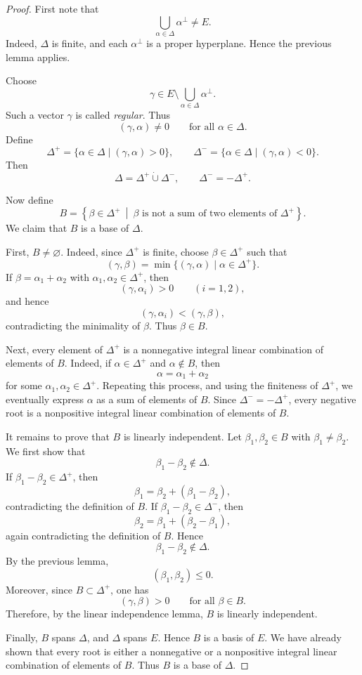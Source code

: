 \begin{proof}
    First note that
    \[
        \bigcup_{\alpha\in\Delta}\alpha^\perp
        \neq E.
    \]
    Indeed, \(\Delta\) is finite, and each \(\alpha^\perp\) is a proper
    hyperplane. Hence the previous lemma applies.

    Choose
    \[
        \gamma\in E\setminus \bigcup_{\alpha\in\Delta}\alpha^\perp.
    \]
    Such a vector \(\gamma\) is called \emph{regular}. Thus
    \[
        (\gamma,\alpha)\neq 0
        \qquad
        \text{for all } \alpha\in\Delta.
    \]
    Define
    \[
        \Delta^+
        =
        \{\alpha\in\Delta\mid (\gamma,\alpha)>0\},
        \qquad
        \Delta^-
        =
        \{\alpha\in\Delta\mid (\gamma,\alpha)<0\}.
    \]
    Then
    \[
        \Delta=\Delta^+\dot\cup\Delta^-,
        \qquad
        \Delta^-=-\Delta^+.
    \]

    Now define
    \[
        B
        =
        \left\{
        \beta\in\Delta^+
        \ \middle|\
        \beta \text{ is not a sum of two elements of } \Delta^+
        \right\}.
    \]
    We claim that \(B\) is a base of \(\Delta\).

    First, \(B\neq\varnothing\). Indeed, since \(\Delta^+\) is finite, choose
    \(\beta\in\Delta^+\) such that
    \[
        (\gamma,\beta)
        =
        \min\{(\gamma,\alpha)\mid \alpha\in\Delta^+\}.
    \]
    If \(\beta=\alpha_1+\alpha_2\) with \(\alpha_1,\alpha_2\in\Delta^+\), then
    \[
        (\gamma,\alpha_i)>0
        \qquad
        (i=1,2),
    \]
    and hence
    \[
        (\gamma,\alpha_i)<(\gamma,\beta),
    \]
    contradicting the minimality of \(\beta\). Thus \(\beta\in B\).

    Next, every element of \(\Delta^+\) is a nonnegative integral linear
    combination of elements of \(B\). Indeed, if \(\alpha\in\Delta^+\) and
    \(\alpha\notin B\), then
    \[
        \alpha=\alpha_1+\alpha_2
    \]
    for some \(\alpha_1,\alpha_2\in\Delta^+\). Repeating this process, and using
    the finiteness of \(\Delta^+\), we eventually express \(\alpha\) as a sum of
    elements of \(B\). Since \(\Delta^-=-\Delta^+\), every negative root is a
    nonpositive integral linear combination of elements of \(B\).

    It remains to prove that \(B\) is linearly independent. Let
    \(\beta_1,\beta_2\in B\) with \(\beta_1\neq\beta_2\). We first show that
    \[
        \beta_1-\beta_2\notin\Delta.
    \]
    If \(\beta_1-\beta_2\in\Delta^+\), then
    \[
        \beta_1=\beta_2+(\beta_1-\beta_2),
    \]
    contradicting the definition of \(B\). If
    \(\beta_1-\beta_2\in\Delta^-\), then
    \[
        \beta_2=\beta_1+(\beta_2-\beta_1),
    \]
    again contradicting the definition of \(B\). Hence
    \[
        \beta_1-\beta_2\notin\Delta.
    \]
    By the previous lemma,
    \[
        (\beta_1,\beta_2)\leq 0.
    \]
    Moreover, since \(B\subset \Delta^+\), one has
    \[
        (\gamma,\beta)>0
        \qquad
        \text{for all } \beta\in B.
    \]
    Therefore, by the linear independence lemma, \(B\) is linearly independent.

    Finally, \(B\) spans \(\Delta\), and \(\Delta\) spans \(E\). Hence \(B\) is a
    basis of \(E\). We have already shown that every root is either a
    nonnegative or a nonpositive integral linear combination of elements of
    \(B\). Thus \(B\) is a base of \(\Delta\).
\end{proof}

